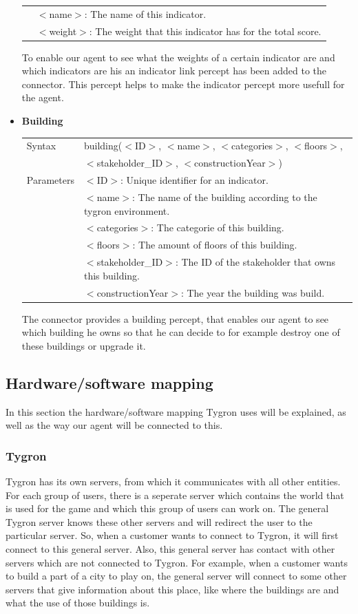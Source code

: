 \begin{itemize}
\begin{tabular}{ l l }
				\\& $<$name$>$: The name of this indicator. 
				\\& $<$weight$>$: The weight that this indicator has for the total score. 
	\end{tabular}
	To enable our agent to see what the weights of a certain indicator are and which indicators are his an indicator link percept has been added to the connector. This percept helps to make the indicator percept more usefull for the agent.
	\item \textbf{Building} \\ 
	\begin{tabular}{ l l }
 		 Syntax & building($<$ID$>$, $<$name$>$, $<$categories$>$, $<$floors$>$, \\
		& $<$stakeholder\_ID$>$, $<$constructionYear$>$) \\
  		Parameters &  $<$ID$>$: Unique identifier for an indicator. 
				\\& $<$name$>$: The name of the building according to the tygron environment.
				\\& $<$categories$>$: The categorie of this building.
				\\& $<$floors$>$: The amount of floors of this building.
				\\& $<$stakeholder\_ID$>$: The ID of the stakeholder that owns this building.
				\\& $<$constructionYear$>$: The year the building was build.
	\end{tabular}
	The connector provides a building percept, that enables our agent to see which building he owns so that he can decide to for example destroy one of these buildings or upgrade it.

\end{itemize}

\newpage
\subsection{Hardware/software mapping}
In this section the hardware/software mapping Tygron uses will be explained, as well as the way our agent will be connected to this.

\subsubsection{Tygron}
Tygron has its own servers, from which it communicates with all other entities. For each group of users, there is a seperate server which contains the world that is used for the game and which this group of users can work on. The general Tygron server knows these other servers and will redirect the user to the particular server. So, when a customer wants to connect to Tygron, it will first connect to this general server. Also, this general server has contact with other servers which are not connected to Tygron. For example, when a customer wants to build a part of a city to play on, the general server will connect to some other servers that give information about this place, like where the buildings are and what the use of those buildings is. 

